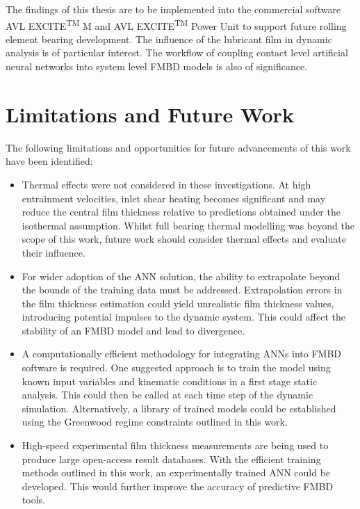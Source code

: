 The findings of this thesis are to be implemented into the commercial software AVL EXCITE\textsuperscript{TM} M and AVL EXCITE\textsuperscript{TM} Power Unit to support future rolling element bearing development. The influence of the lubricant film in dynamic analysis is of particular interest. The workflow of coupling contact level artificial neural networks into system level FMBD models is also of significance.

\section{Limitations and Future Work}

The following limitations and opportunities for future advancements of this work have been identified:

\begin{itemize}
	\item Thermal effects were not considered in these investigations. At high entrainment velocities, inlet shear heating becomes significant and may reduce the central film thickness relative to predictions obtained under the isothermal assumption. Whilst full bearing thermal modelling was beyond the scope of this work, future work should consider thermal effects and evaluate their influence.
	
	\item For wider adoption of the ANN solution, the ability to extrapolate beyond the bounds of the training data must be addressed. Extrapolation errors in the film thickness estimation could yield unrealistic film thickness values, introducing potential impulses to the dynamic system. This could  affect the stability of an FMBD model and lead to divergence.
	
	\item A computationally efficient methodology for integrating ANNs into FMBD software is required. One suggested approach is to train the model using known input variables and kinematic conditions in a first stage static analysis. This could then be called at each time step of the dynamic simulation. Alternatively, a library of trained models could be established using the Greenwood regime constraints outlined in this work.
	
	\item High-speed experimental film thickness measurements are being used to produce large open-access result databases. With the efficient training methods outlined in this work, an experimentally trained ANN could be developed. This would further improve the accuracy of predictive FMBD tools.
\end{itemize}